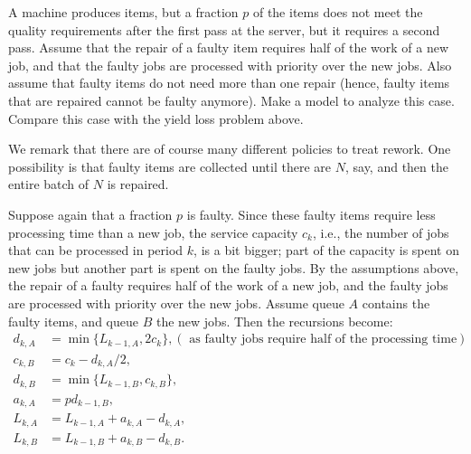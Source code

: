 \begin{exercise} 

  A machine produces items, but a fraction $p$ of the items does not meet the quality requirements after the first pass at the server, but it requires a second pass.
  Assume that the repair of a faulty item requires half of the work of a new job, and that the faulty jobs are processed with priority over the new jobs.
  Also assume that faulty items do not need more than one repair (hence, faulty items that are repaired cannot be faulty anymore).
  Make a model to analyze this case.
  Compare this case with the yield loss problem above.


  We remark that there are of course many different policies to treat rework.
  One possibility is that faulty items are collected until there are $N$, say, and then the entire batch of $N$ is repaired.
  \begin{solution}
    Suppose again that a fraction $p$ is faulty. Since these faulty
    items require less processing time than a new job, the service
    capacity $c_k$, i.e., the number of jobs that can be processed in
    period $k$, is a bit bigger; part of the capacity is spent on new
    jobs but another part is spent on the faulty jobs. By the
    assumptions above, the repair of a faulty requires half of the
    work of a new job, and the faulty jobs are processed with priority
    over the new jobs. Assume queue $A$ contains the faulty items, and
    queue $B$ the new jobs. Then the recursions become:
\begin{equation*}
  \begin{split}
    d_{k,A} &= \min\{L_{k-1, A}, 2c_k\}, (\text{ as faulty jobs require half of the processing time})\\
    c_{k,B} &= c_k - d_{k,A}/2, \\
    d_{k,B} &= \min\{L_{k-1, B}, c_{k,B}\}, \\
    a_{k,A} &= p d_{k-1, B}, \\
    L_{k,A} &= L_{k-1, A} + a_{k,A} - d_{k,A}, \\
    L_{k,B} &= L_{k-1, B} + a_{k,B} - d_{k,B}.
  \end{split}
\end{equation*}
  \end{solution}
\end{exercise}


